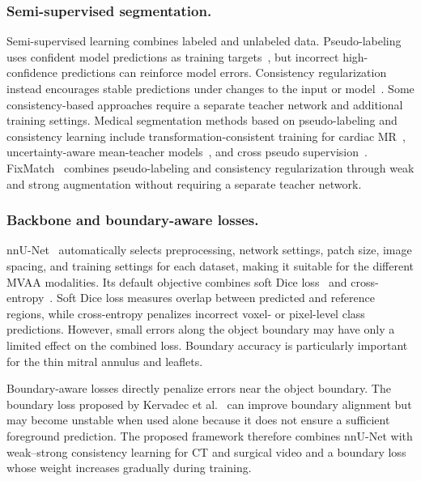 \documentclass[runningheads]{llncs}
\begin{document}
\subsubsection{Semi-supervised segmentation.}

Semi-supervised learning combines labeled and unlabeled data.
Pseudo-labeling uses confident model predictions as training
targets~\cite{ref_pseudo}, but incorrect high-confidence predictions
can reinforce model errors. Consistency regularization instead
encourages stable predictions under changes to the input or
model~\cite{ref_meanteacher}. Some consistency-based approaches require
a separate teacher network and additional training settings. Medical
segmentation methods based on pseudo-labeling and consistency learning
include transformation-consistent training for cardiac
MR~\cite{ref_bai}, uncertainty-aware mean-teacher
models~\cite{ref_uamt}, and cross pseudo
supervision~\cite{ref_cps}. FixMatch~\cite{ref_fixmatch} combines
pseudo-labeling and consistency regularization through weak and strong
augmentation without requiring a separate teacher network.

\subsubsection{Backbone and boundary-aware losses.}

nnU-Net~\cite{ref_nnunet} automatically selects preprocessing, network
settings, patch size, image spacing, and training settings for each
dataset, making it suitable for the different MVAA modalities. Its
default objective combines soft Dice loss~\cite{ref_milletari} and
cross-entropy~\cite{ref_goodfellow}. Soft Dice loss measures overlap
between predicted and reference regions, while cross-entropy penalizes
incorrect voxel- or pixel-level class predictions. However, small
errors along the object boundary may have only a limited effect on the
combined loss. Boundary accuracy is particularly important for the
thin mitral annulus and leaflets.

Boundary-aware losses directly penalize errors near the object
boundary. The boundary loss proposed by Kervadec et
al.~\cite{ref_boundary} can improve boundary alignment but may become
unstable when used alone because it does not ensure a sufficient
foreground prediction. The proposed framework therefore combines
nnU-Net with weak--strong consistency learning for CT and surgical
video and a boundary loss whose weight increases gradually during
training.
\end{document}
